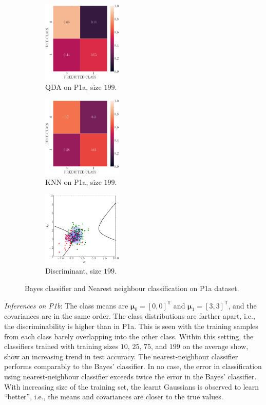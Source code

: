 \documentclass[11pt, a4 paper]{article}
\newcommand{\TT}{\mathsf{T}}
\newcommand{\bmu}{\boldsymbol{\mu}}
\begin{document}
\begin{figure}[!htbp]
\quad    
    \begin{subfigure}[!htbp]{0.24\textwidth}
       \centering
       \includegraphics[width=1.5in]{../results/ex1/conf_mtx_QD_ML_dataset_P1a_size_199.pdf}
       \caption{QDA on P1a, size $199$.}
       \label{fig:QDA_P1a_199}
    \end{subfigure}
\quad    
    \begin{subfigure}[!htbp]{0.24\textwidth}
       \centering
       \includegraphics[width=1.5in]{../results/ex1/conf_mtx_KNN_dataset_P1a_size_199.pdf}
       \caption{KNN on P1a, size $199$.}
       \label{fig:KNN_P1a_199}
    \end{subfigure}
\quad
    \begin{subfigure}[!htbp]{0.24\textwidth}
       \centering
       \includegraphics[width=1.5in]{../results/ex1/samples_QD_ML_dataset_P1a_size_199.pdf}
       \caption{Discriminant, size $199$.}
       \label{fig:DF_P1a_199}
    \end{subfigure}

\caption{Bayes classifier and Nearest neighbour classification on P1a dataset.}
\label{fig:ex11P1a}
\end{figure}

{\it Inferences on P1b}: The class means are $\bmu_{0} = [0,0]^{\TT}$ and $\bmu_{1} = [3,3]^{\TT}$, and the covariances are in the same order. The class distributions are farther apart, i.e., the discriminability is higher than in P1a. This is seen with the training samples from each class barely overlapping into the other class. Within this setting, the classifiers trained with training sizes $10$, $25$, $75$, and $199$ on the average show, show an increasing trend in test accuracy. The nearest-neighbour classifier performs comparably to the Bayes' classifier. In no case, the error in classification using nearest-neighbour classifier exceeds twice the error in the Bayes' classifier. With increasing size of the training set, the learnt Gaussians is observed to learn ``better'', i.e., the means and covariances are closer to the true values.
\end{document}
